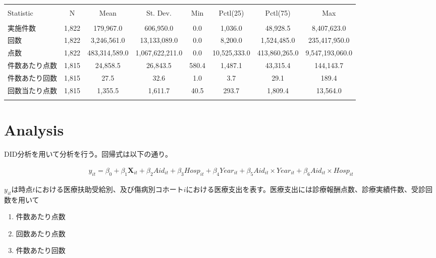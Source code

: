 \documentclass{jsarticle}
\begin{document}
\begin{table}[!htbp] \centering 
  \caption{} 
  \label{} 
\begin{tabular}{@{\extracolsep{3pt}}lccccccc} 
\\[-1.8ex]\hline 
\hline \\[-1.8ex] 
Statistic & \multicolumn{1}{c}{N} & \multicolumn{1}{c}{Mean} & \multicolumn{1}{c}{St. Dev.} & \multicolumn{1}{c}{Min} & \multicolumn{1}{c}{Pctl(25)} & \multicolumn{1}{c}{Pctl(75)} & \multicolumn{1}{c}{Max} \\ 
\hline \\[-1.8ex] 
実施件数 & 1,822 & 179,967.0 & 606,950.0 & 0.0 & 1,036.0 & 48,928.5 & 8,407,623.0 \\ 
回数 & 1,822 & 3,246,561.0 & 13,133,089.0 & 0.0 & 8,200.0 & 1,524,485.0 & 235,417,950.0 \\ 
点数 & 1,822 & 483,314,589.0 & 1,067,622,211.0 & 0.0 & 10,525,333.0 & 413,860,265.0 & 9,547,193,060.0 \\ 
件数あたり点数 & 1,815 & 24,858.5 & 26,843.5 & 580.4 & 1,487.1 & 43,315.4 & 144,143.7 \\ 
件数あたり回数 & 1,815 & 27.5 & 32.6 & 1.0 & 3.7 & 29.1 & 189.4 \\ 
回数当たり点数 & 1,815 & 1,355.5 & 1,611.7 & 40.5 & 293.7 & 1,809.4 & 13,564.0 \\ 
\hline \\[-1.8ex] 
\end{tabular} 
\end{table} 

\section{Analysis}

DID分析を用いて分析を行う。回帰式は以下の通り。

 \begin{align*}
 y_{it} = \beta_0 + \beta_1 \mathbf{X}_{it} + \beta_2 \textit{Aid}_{it} + \beta_3 \textit{Hosp}_{it} +
 \beta_4 \textit{Year}_{it} + \beta_5 \textit{Aid}_{it} \times \textit{Year}_{it} + \beta_6 \textit{Aid}_{it} \times \textit{Hosp}_{it} 
 \end{align*}

$y_{it}$は時点$t$における医療扶助受給別、及び傷病別コホート$i$における医療支出を表す。医療支出には診療報酬点数、診療実績件数、受診回数を用いて

 \begin{enumerate}
 
 \item 件数あたり点数
 
 \item 回数あたり点数
 
 \item 件数あたり回数
 
 \end{enumerate}
\end{document}
